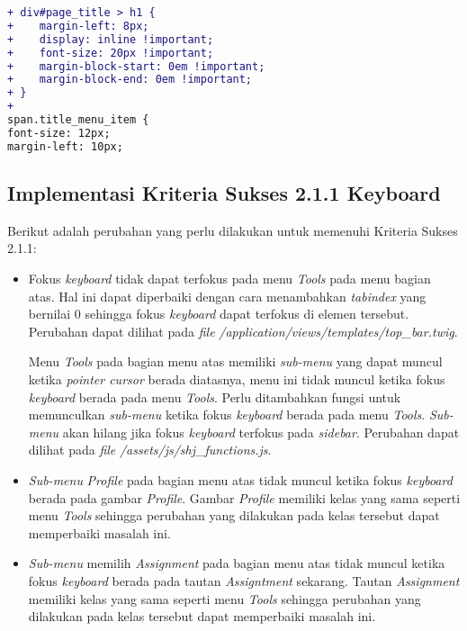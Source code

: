 \begin{itemize}
\begin{lstlisting}[language=diff, caption=Perubahan untuk mematuhi kriteria 1.3.1, label=lst_1.3.1, basicstyle=\ttfamily, frame=single,
columns=fullflexible, keepspaces=true, breaklines=true]
+ div#page_title > h1 {
+    margin-left: 8px;
+    display: inline !important;
+    font-size: 20px !important;
+    margin-block-start: 0em !important;
+    margin-block-end: 0em !important;
+ }
+
span.title_menu_item {
font-size: 12px;
margin-left: 10px;
\end{lstlisting}

\end{itemize}

\subsection{Implementasi Kriteria Sukses 2.1.1 Keyboard}
\label{subsec:implementasi_A_2.1.1}
Berikut adalah perubahan yang perlu dilakukan untuk memenuhi Kriteria Sukses 2.1.1:

\begin{itemize}
	\item Fokus \textit{keyboard} tidak dapat terfokus pada menu \textit{Tools} pada menu bagian atas. Hal ini dapat diperbaiki dengan cara menambahkan \textit{tabindex} yang bernilai 0 sehingga fokus \textit{keyboard} dapat terfokus di elemen tersebut. Perubahan dapat dilihat pada \textit{file} \textit{/application/views/templates/top\_bar.twig}.
	
	Menu \textit{Tools} pada bagian menu atas memiliki \textit{sub-menu} yang dapat muncul ketika \textit{pointer cursor} berada diatasnya, menu ini tidak muncul ketika fokus \textit{keyboard} berada pada menu \textit{Tools}. Perlu ditambahkan fungsi untuk memunculkan \textit{sub-menu} ketika fokus \textit{keyboard} berada pada menu \textit{Tools}. \textit{Sub-menu} akan hilang jika fokus \textit{keyboard} terfokus pada \textit{sidebar}. Perubahan dapat dilihat pada \textit{file} \textit{/assets/js/shj\_functions.js}.

	\item \textit{Sub-menu} \textit{Profile} pada bagian menu atas tidak muncul ketika fokus \textit{keyboard} berada pada gambar \textit{Profile}. Gambar \textit{Profile} memiliki kelas yang sama seperti menu \textit{Tools} sehingga perubahan yang dilakukan pada kelas tersebut dapat memperbaiki masalah ini.
	
	\item \textit{Sub-menu} memilih \textit{Assignment} pada bagian menu atas tidak muncul ketika fokus \textit{keyboard} berada pada tautan \textit{Assigntment} sekarang. Tautan \textit{Assignment} memiliki kelas yang sama seperti menu \textit{Tools} sehingga perubahan yang dilakukan pada kelas tersebut dapat memperbaiki masalah ini.
	

\end{itemize}
